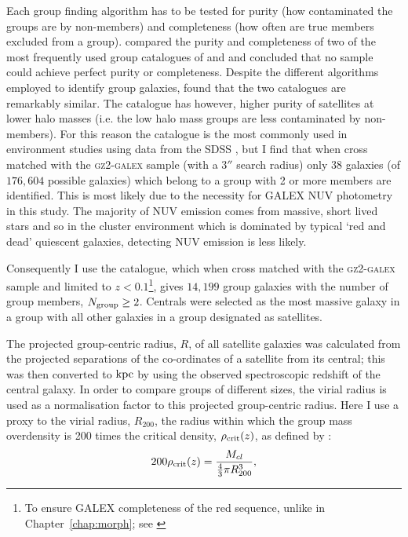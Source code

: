 Each group finding algorithm has to be tested for purity (how contaminated the groups are by non-members) and completeness (how often are true members excluded from a group). \citet{campbell15} compared the purity and completeness of two of the most frequently used group catalogues of \citet[][a friends-of-friends algorithm]{berlind06} and \citet[][a halo modelling algorithm]{yang07} and concluded that no sample could achieve perfect purity or completeness. Despite the different algorithms employed to identify group galaxies, \citeauthor{campbell15} found that the two catalogues are remarkably similar. The \citeauthor{yang07} catalogue has however, higher purity of satellites at lower halo masses (i.e. the low halo mass groups are less contaminated by non-members). For this reason the \citeauthor{yang07} catalogue is the most commonly used in environment studies using data from the SDSS \citep[including][]{hoyle11, pasquali12, wetzel14, shankar14, lacerna14, knobel15, fitzpatrick15, lan16, woo16, bluck16, weigel16}, but I find that when cross matched with the \textsc{gz2-galex} sample (with a $3''$ search radius) only $38$ galaxies (of $176,604$ possible galaxies) which belong to a group with 2 or more members are identified. This is most likely due to the necessity for GALEX NUV photometry in this study. The majority of NUV emission comes from massive, short lived stars and so in the cluster environment which is dominated by typical `red and dead' quiescent galaxies, detecting NUV emission is less likely. 

Consequently I use the \citet{berlind06} catalogue, which when cross matched with the \textsc{gz2-galex} sample and limited to $z < 0.1$\footnote{To ensure GALEX completeness of the red sequence, unlike in Chapter~\ref{chap:morph}; see \citealt{Wyder07, Yesuf14}}, gives $14,199$ group galaxies with the number of group members, $N_{\rm{group}} \geq 2$. Centrals were selected as the most massive galaxy in a group \citep[as in][]{yang07, yang09, pasquali10} with all other galaxies in a group designated as satellites.

The projected group-centric radius, $R$, of all satellite galaxies was calculated from the projected separations of the co-ordinates of a satellite from its central; this was then converted to $\rm{kpc}$ by using the observed spectroscopic redshift of the central galaxy. In order to compare groups of different sizes, the virial radius is used as a normalisation factor to this projected group-centric radius. Here I use a proxy to the virial radius, $R_{200}$\citep[see][]{navarro95}, the radius within which the group mass overdensity is 200 times the critical density, $\rho_{\rm{crit}}(z)$, as defined by \citealt{finn05}:
\begin{equation}\label{eq:overdense}
200\rho_{\rm{crit}}(z) = \frac{M_{cl}}{\frac{4}{3}\pi R_{200}^3},
\end{equation}

